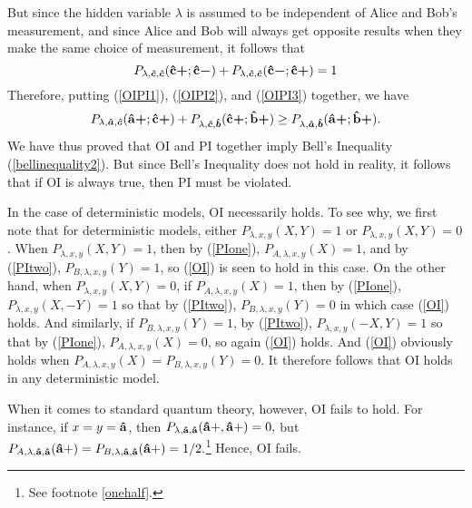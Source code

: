 But since the hidden variable $\lambda$ is assumed to be independent of Alice and Bob's measurement, and since Alice and Bob will always get opposite results when they make the same choice of measurement, it follows that 
\begin{equation}\label{OIPI3}
P_{\lambda,\bm{\hat{c}},\bm{\hat{c}}}(\vb{\hat{{c}}}\bm{+};\vb{\hat{{c}}}\bm{-})+P_{\lambda,\bm{\hat{c}},\bm{\hat{c}}}(\vb{\hat{{c}}}\bm{-};\vb{\hat{{c}}}\bm{+})=1
\end{equation}
Therefore, putting (\ref{OIPI1}), (\ref{OIPI2}), and (\ref{OIPI3}) together, we have
\begin{equation}
P_{\lambda,\bm{\hat{a}},\bm{\hat{c}}}(\vb{\hat{{a}}}\bm{+};\vb{\hat{{c}}}\bm{+})+P_{\lambda,\bm{\hat{c}},\bm{\hat{b}}}(\vb{\hat{{c}}}\bm{+};\vb{\hat{{b}}}\bm{+})\geq P_{\lambda,\bm{\hat{a}},\bm{\hat{b}}}(\vb{\hat{{a}}}\bm{+};\vb{\hat{{b}}}\bm{+}).
\end{equation}
We have thus proved that OI and PI together imply Bell's Inequality (\ref{bellinequality2}). But since Bell's Inequality does not hold in reality, it follows that if OI is always true, then PI must be violated.\label{OIPIproofend}


\label{OIdet}In the case of deterministic models, OI necessarily holds. To see why, we first note that for deterministic models, either $P_{\lambda,x,y}(X,Y)=1$ or $P_{\lambda,x,y}(X,Y)=0$. When $P_{\lambda,x,y}(X,Y)=1$, then by (\ref{PIone}), $P_{A, \lambda,x,y}(X)=1$, and by (\ref{PItwo}), $P_{B, \lambda,x,y}(Y)=1$, so (\ref{OI}) is seen to hold in this case. On the other hand, when $P_{\lambda,x,y}(X,Y)=0$,  if $P_{A, \lambda,x,y}(X)=1$, then by (\ref{PIone}), $P_{\lambda,x,y} (X,-Y)=1$ so that by (\ref{PItwo}), $P_{B, \lambda,x,y}(Y)=0$ in which case (\ref{OI}) holds. And similarly, if $P_{B, \lambda,x,y}(Y)=1$, by (\ref{PItwo}), $P_{\lambda,x,y} (-X,Y)=1$ so that by (\ref{PIone}), $P_{A, \lambda,x,y}(X)=0$, so again (\ref{OI}) holds. And (\ref{OI}) obviously holds when $P_{A, \lambda,x,y}(X)=P_{B, \lambda,x,y}(Y)=0$. It therefore follows that OI holds in any deterministic model.

When it comes to standard quantum theory, however, OI fails to hold. For instance, if $x=y=\vb{\hat{a}}$, then $P_{\lambda,\vb{\hat{a}},\vb{\hat{a}}}(\vb{\hat{a}+},\vb{\hat{a}+})=0,$ but $P_{A, \lambda,\vb{\hat{a}},\vb{\hat{a}}}(\vb{\hat{a}+})=P_{B, \lambda,\vb{\hat{a}},\vb{\hat{a}}}(\vb{\hat{a}+})=1/2.$\footnote{See footnote \ref{onehalf}. } Hence, OI fails. 

